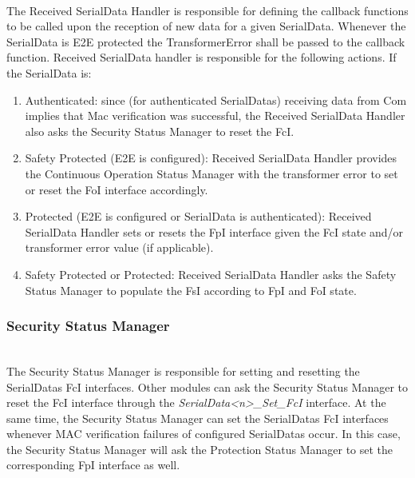 \\
The Received SerialData Handler is responsible for defining the callback functions to be called upon the reception of new data for a given SerialData.
Whenever the SerialData is E2E protected the TransformerError shall be passed to the callback function.
Received SerialData handler is responsible for the following actions. If the SerialData is:
\begin{enumerate}
    \item Authenticated: since (for authenticated SerialDatas) receiving data from Com implies that Mac verification was successful, the Received SerialData Handler also asks the Security Status Manager to reset the FcI.
    \item Safety Protected (E2E is configured): Received SerialData Handler provides the Continuous Operation Status Manager with the transformer error to set or reset the FoI interface accordingly.
    \item Protected (E2E is configured or SerialData is authenticated): Received SerialData Handler sets or resets the FpI interface given the FcI state and/or transformer error value (if applicable).
    \item Safety Protected or Protected: Received SerialData Handler asks the Safety Status Manager to populate the FsI according to FpI and FoI state.
\end{enumerate}

{ }


\subsubsection{Security Status Manager}
\\
The Security Status Manager is responsible for setting and resetting the SerialDatas FcI interfaces. Other modules can ask the Security Status Manager to reset the FcI interface through the \textit{SerialData<n>_Set_FcI} interface. 
At the same time, the Security Status Manager can set the SerialDatas FcI interfaces whenever MAC verification failures of configured SerialDatas occur. 
In this case, the Security Status Manager will ask the Protection Status Manager to set the corresponding FpI interface as well.

{   }

